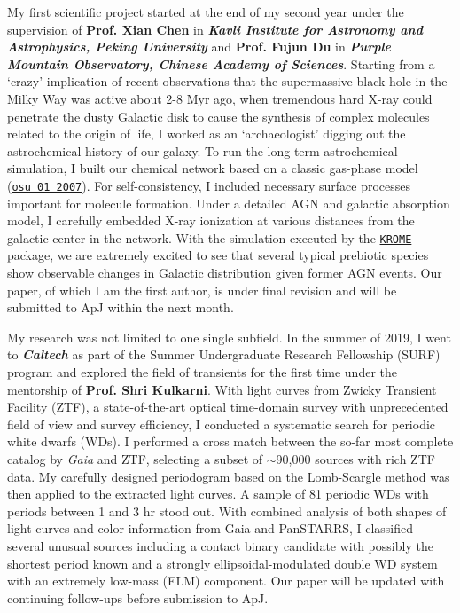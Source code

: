\documentclass[11pt, a4paper]{awesome-cv} %
\begin{document}
\begin{cvletter}
My first scientific project started at the end of my second year under the supervision of \textbf{Prof. Xian Chen} in \textbf{\textit{Kavli Institute for Astronomy and Astrophysics, Peking University}} and \textbf{Prof. Fujun Du} in \textbf{\textit{Purple Mountain Observatory, Chinese Academy of Sciences}}. Starting from a `crazy' implication of recent observations that the supermassive black hole in the Milky Way was active about 2-8 Myr ago, when tremendous hard X-ray could penetrate the dusty Galactic disk to cause the synthesis of complex molecules related to the origin of life, I worked as an `archaeologist' digging out the astrochemical history of our galaxy. To run the long term astrochemical simulation, I built our chemical network based on a classic gas-phase model (\href{http://faculty.virginia.edu/ericherb/research_files/osu_01_2007}{\texttt{osu\_01\_2007}}). For self-consistency, I included necessary surface processes important for molecule formation. Under a detailed AGN and galactic absorption model, I carefully embedded X-ray ionization at various distances from the galactic center in the network. With the simulation executed by the \href{http://kromepackage.org}{\texttt{KROME}} package, we are extremely excited to see that several typical prebiotic species show observable changes in Galactic distribution given former AGN events. Our paper, of which I am the first author, is under final revision and will be submitted to ApJ within the next month.

My research was not limited to one single subfield. In the summer of 2019, I went to \textbf{\textit{Caltech}} as part of the Summer Undergraduate Research Fellowship (SURF) program and explored the field of transients for the first time under the mentorship of \textbf{Prof. Shri Kulkarni}. With light curves from Zwicky Transient Facility (ZTF), a state-of-the-art optical time-domain survey with unprecedented field of view and survey efficiency, I conducted a systematic search for periodic white dwarfs (WDs). I performed a cross match between the so-far most complete catalog by \textit{Gaia} and ZTF, selecting a subset of $\sim$90,000 sources with rich ZTF data. My carefully designed periodogram based on the Lomb-Scargle method was then applied to the extracted light curves. A sample of 81 periodic WDs with periods between 1 and 3 hr stood out. With combined analysis of both shapes of light curves and color information from Gaia and PanSTARRS, I classified several unusual sources including a contact binary candidate with possibly the shortest period known and a strongly ellipsoidal-modulated double WD system with an extremely low-mass (ELM) component. Our paper will be updated with continuing follow-ups before submission to ApJ.


\end{cvletter}
\end{document}
